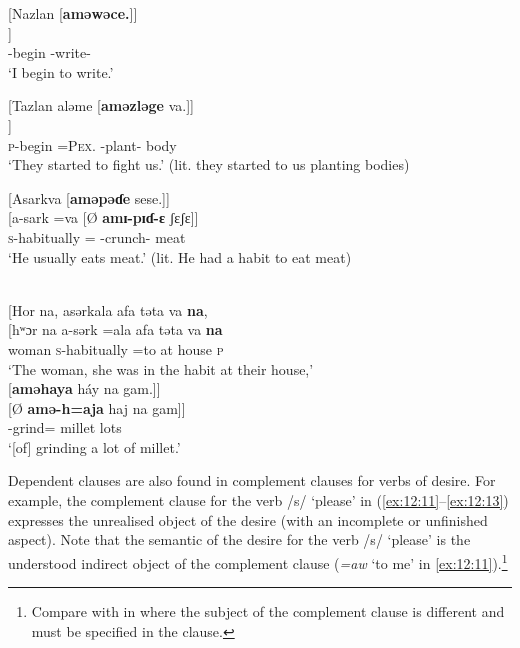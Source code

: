 \ea \label{ex:12:7}
[Nazlan  [\textbf{aməwəce.}]]\\
\gll  [na-ɮaŋ    [Ø \textbf{amu-wutʃ-ɛ}]]\\
      {\oneS}-begin    {}  {\DEP}-write-{\CL}\\
\glt  ‘I begin to write.’ 
\z 

\ea \label{ex:12:8}
[Tazlan  aləme  [\textbf{aməzləge} va.]]\\
\gll  [ta-ɮaŋ     =alɪmɛ  [Ø \textbf{amɪ-ɮɪg-ɛ}  va]]\\
      \textsc{p}-begin   =\textsc{Pex}.{\IO}   {} {\DEP}-plant-{\CL}  body\\
\glt  ‘They started to fight us.’ (lit. they started to us planting bodies) 
\z 

\ea \label{ex:12:9}
{}[Asarkva  [\textbf{aməpəɗe} sese.]]\\
\gll  {}[a-sark   =va  [Ø \textbf{amɪ-pɪɗ-ɛ}   ʃɛʃɛ]]\\
      \textsc{s}-{habitually}   ={\PRF}  {}  {\DEP}-crunch-{\CL}  meat\\
\glt  ‘He usually eats meat.’ (lit. He had a habit to eat meat)
\z 

\ea \label{ex:12:10}
\\
{}[Hor  na,  asərkala  afa  təta  va \textbf{na},\\  
\gll  {}[hʷɔr  na  a-sərk  =ala   afa   təta  va \textbf{na}\\ 
      woman    {\PSP}  \textsc{s}-{habitually} =to  {at house}  \textsc{p}  {\PRF}  {\PSP} \\
\glt ‘The woman, she was in the habit at their house,’\\
      
      \medskip
{}[\textbf{aməhaya} háy  na  gam.]]\\     
\gll {}[Ø  \textbf{amə-h=aja} haj na gam]]\\
     {} {\DEP}-grind={\PLU}  millet  {\PSP}  lots\\
\glt  ‘[of] grinding a lot of millet.’
\z 

Dependent clauses are also found in complement clauses for verbs of desire. For example, the complement clause for the verb  /s/ ‘please’ in (\ref{ex:12:11}--\ref{ex:12:13}) expresses the unrealised object of the desire (with an incomplete or unfinished aspect). Note that the semantic {\LOC} of the desire for the verb /s/ ‘please’ is the understood indirect object of the complement clause (\textit{=aw} ‘to me’ in \ref{ex:12:11}).\footnote{Compare with  in  where the subject of the complement clause is different and must be specified in the clause.} 

